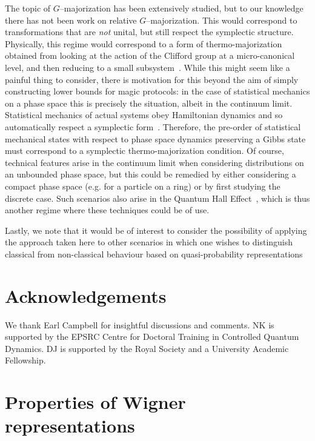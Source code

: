 \documentclass[pra,
aps,
twocolumn,
superscriptaddress,
groupedaddress,
nofootinbib,
reprint
]{revtex4-1}
\begin{document}
The topic of $G$--majorization has been extensively studied, but to our knowledge there has not been work on relative $G$--majorization. This would correspond to transformations that are \emph{not} unital, but still respect the symplectic structure. Physically, this regime would correspond to a form of thermo-majorization obtained from looking at the action of the Clifford group at a micro-canonical level, and then reducing to a small subsystem~\cite{cit:lostaglio, Pathria_1997}. While this might seem like a painful thing to consider, there is motivation for this beyond the aim of simply constructing lower bounds for magic protocols: in the case of statistical mechanics on a phase space this is precisely the situation, albeit in the continuum limit. Statistical mechanics of actual systems obey Hamiltonian dynamics and so automatically respect a symplectic form~\cite{Pathria_1997}. Therefore, the pre-order of statistical mechanical states with respect to phase space dynamics preserving a Gibbs state must correspond to a symplectic thermo-majorization condition. Of course, technical features arise in the continuum limit when considering distributions on an unbounded phase space, but this could be remedied by either considering a compact phase space (e.g. for a particle on a ring) or by first studying the discrete case. Such scenarios also arise in the Quantum Hall Effect~\cite{Klitzing_1980}, which is thus another regime where these techniques could be of use.

Lastly, we note that it would be of interest to consider the possibility of applying the approach taken here to other scenarios in which one wishes to distinguish classical from non-classical behaviour based on quasi-probability representations~\cite{Ferrie_2008, barnett_1997}
\section{Acknowledgements}
We thank Earl Campbell for insightful discussions and comments. NK is supported by the EPSRC Centre for Doctoral Training in Controlled Quantum Dynamics. DJ is supported by the Royal Society and a University Academic Fellowship.
	


%


\appendix
\newpage
\section{Properties of Wigner representations}
\label{app:wigner}
\end{document}
